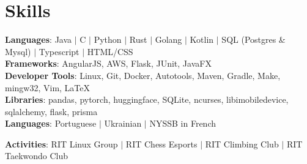 \documentclass[letterpaper,11pt]{article}
\begin{document}
\section{Skills}
 \begin{itemize}[leftmargin=0.15in, label={}]
    \small{\item{
        \textbf{Languages}{: Java $|$ C $|$ Python $|$ Rust $|$ Golang $|$ Kotlin $|$ SQL (Postgres \& Mysql) $|$ Typescript $|$ HTML/CSS} \\ \vspace{0.5em} 
        \textbf{Frameworks}{: AngularJS, AWS, Flask, JUnit, JavaFX} \\ \vspace{0.5em} 
        \textbf{Developer Tools}{: Linux, Git, Docker, Autotools, Maven, Gradle, Make, mingw32, Vim, \LaTeX} \\ \vspace{0.5em} 
        \textbf{Libraries}{: pandas, pytorch, huggingface, SQLite, ncurses, libimobiledevice, sqlalchemy, flask, prisma} \\ \vspace{0.5em} 
        \textbf{Languages}{: Portuguese $|$ Ukrainian $|$ NYSSB in French} \\ \vspace{0.5em} 

        \textbf{Activities}{: RIT Linux Group $|$ RIT Chess Esports $|$ RIT Climbing Club $|$ RIT Taekwondo Club}}}
 \end{itemize}


\end{document}
